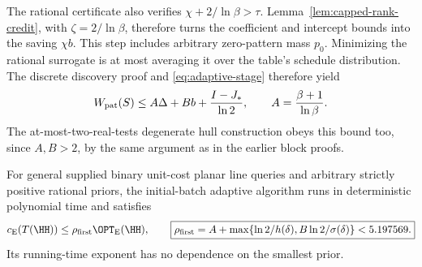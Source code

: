 The rational certificate also verifies $\chi+2/\ln\beta>\tau$.
Lemma~\ref{lem:capped-rank-credit}, with $\zeta=2/\ln\beta$,
therefore turns the coefficient and intercept bounds into the saving
$\chi b$. This step includes arbitrary zero-pattern mass $p_0$.
Minimizing the rational surrogate is at most averaging it over the
table's schedule distribution. The discrete discovery proof and
\eqref{eq:adaptive-stage} therefore yield
\begin{equation}\label{eq:first-phase-local}
 W_{\rm pat}(S)\le A\Delta+B b+\frac{I-J_*}{\ln2},
 \qquad A=\frac{\beta+1}{\ln\beta}.
\end{equation}
The at-most-two-real-tests degenerate hull construction obeys this
bound too, since $A,B>2$, by the same argument as in the earlier
block proofs.

\begin{theorem}
\label{thm:first-phase-expected}
For general supplied binary unit-cost planar line queries and arbitrary
strictly positive rational priors, the initial-batch adaptive algorithm
runs in deterministic polynomial time and satisfies
\[
 c_{\mathrm E}(T(\HH))\le\rho_{\rm first}\OPT_{\mathrm E}(\HH),
 \qquad
 \boxed{\rho_{\rm first}=
 A+\max\{\ln2/h(\delta),B\ln2/\sigma(\delta)\}<5.197569.}
\]
Its running-time exponent has no dependence on the smallest prior.
\end{theorem}
